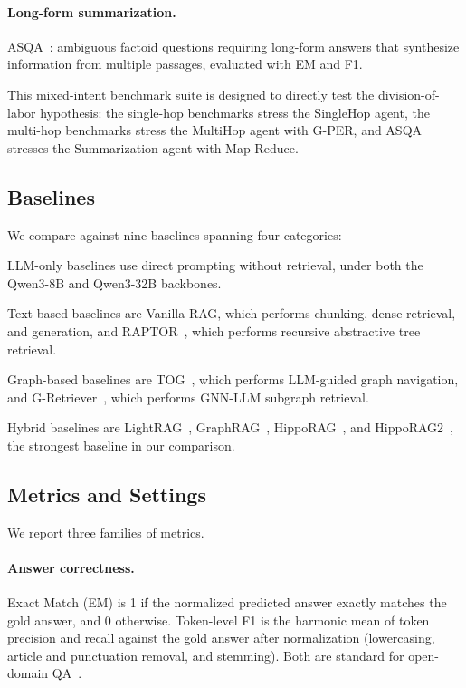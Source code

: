 \documentclass[11pt,a4paper]{article}
\begin{document}
\paragraph{Long-form summarization.}
ASQA~\citep{stelmakh2022asqa}: ambiguous factoid questions requiring long-form answers that synthesize information from multiple passages, evaluated with EM and F1.

This mixed-intent benchmark suite is designed to directly test the division-of-labor hypothesis: the single-hop benchmarks stress the SingleHop agent, the multi-hop benchmarks stress the MultiHop agent with G-PER, and ASQA stresses the Summarization agent with Map-Reduce.

\subsection{Baselines}

We compare against nine baselines spanning four categories:

\noindent LLM-only baselines use direct prompting without retrieval, under both the Qwen3-8B and Qwen3-32B backbones.

\noindent Text-based baselines are Vanilla RAG, which performs chunking, dense retrieval, and generation, and RAPTOR~\citep{sarthi2024raptor}, which performs recursive abstractive tree retrieval.

\noindent Graph-based baselines are TOG~\citep{sun2024tog}, which performs LLM-guided graph navigation, and G-Retriever~\citep{he2024gretriever}, which performs GNN-LLM subgraph retrieval.

\noindent Hybrid baselines are LightRAG~\citep{guo2024lightrag}, GraphRAG~\citep{edge2024graphrag}, HippoRAG~\citep{gutierrez2024hipporag}, and HippoRAG2~\citep{gutierrez2025hipporag2}, the strongest baseline in our comparison.

\subsection{Metrics and Settings}

We report three families of metrics.

\paragraph{Answer correctness.}
Exact Match (EM) is 1 if the normalized predicted answer exactly matches the gold answer, and 0 otherwise.
Token-level F1 is the harmonic mean of token precision and recall against the gold answer after normalization (lowercasing, article and punctuation removal, and stemming).
Both are standard for open-domain QA~\citep{rajpurkar2016squad}.
\end{document}
